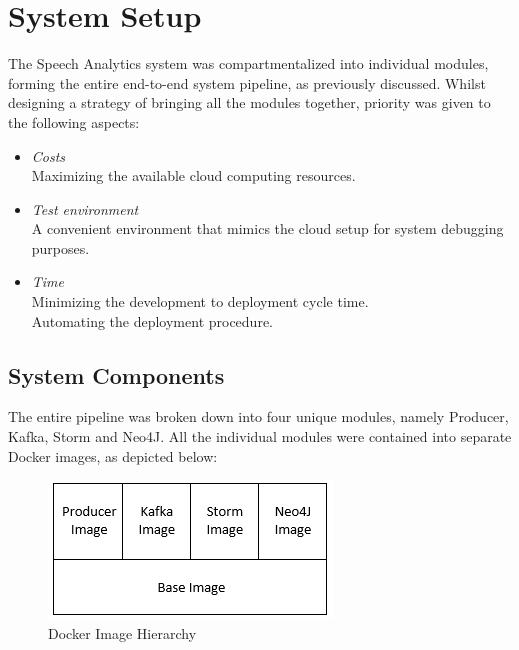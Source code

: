 \documentclass[10pt,conference]{IEEEtran}
\begin{document}
\section{System Setup}
The Speech Analytics system was compartmentalized into individual modules, forming the entire end-to-end system pipeline, as previously discussed. Whilst designing a strategy of bringing all the modules together, priority was given to the following aspects:
\begin{itemize}
    \item \textit{Costs}            \\ Maximizing the available cloud computing resources.
    \item \textit{Test environment} \\ A convenient environment that mimics the cloud setup for system debugging purposes.
    \item \textit{Time}             \\ Minimizing the development to deployment cycle time.
                                    \\ Automating the deployment procedure.
\end{itemize}

\subsection{System Components}
The entire pipeline was broken down into four unique modules, namely Producer, Kafka, Storm and Neo4J. All the individual modules were contained into separate Docker images, as depicted below:

\begin{figure}[h]
    \includegraphics[width=\linewidth]{DockerImageHierarchy.png}
    \captionsetup                     {justification=centering}
    \caption                          {Docker Image Hierarchy}
    \label                            {fig:DockerImageHierarchy}
\end{figure}
\end{document}
